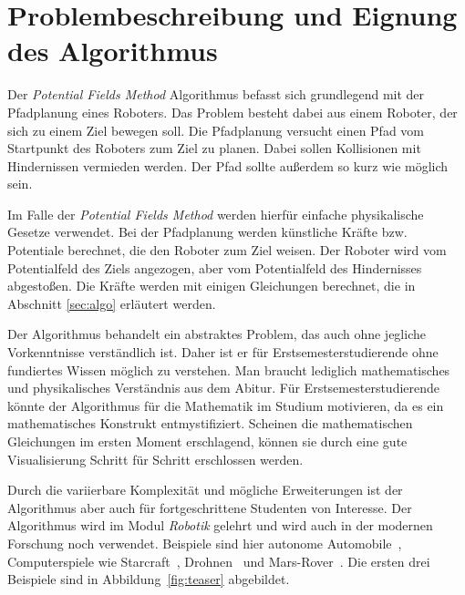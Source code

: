 
\section{Problembeschreibung und Eignung des Algorithmus}\label{sec:intro}

Der \textit{Potential Fields Method} Algorithmus befasst sich grundlegend mit der Pfadplanung eines Roboters. Das Problem besteht dabei aus einem Roboter, der sich zu einem Ziel bewegen soll. Die Pfadplanung versucht einen Pfad vom Startpunkt des Roboters zum Ziel zu planen. Dabei sollen Kollisionen mit Hindernissen vermieden werden. Der Pfad sollte außerdem so kurz wie möglich sein.

Im Falle der \textit{Potential Fields Method} werden hierfür einfache physikalische Gesetze verwendet. Bei der Pfadplanung werden künstliche Kräfte bzw. Potentiale berechnet, die den Roboter zum Ziel weisen. Der Roboter wird vom Potentialfeld des Ziels angezogen, aber vom Potentialfeld des Hindernisses abgestoßen. Die Kräfte werden mit einigen Gleichungen berechnet, die in Abschnitt \vref{sec:algo} erläutert werden.

Der Algorithmus behandelt ein abstraktes Problem, das auch ohne jegliche Vorkenntnisse verständlich ist. Daher ist er für Erstsemesterstudierende ohne fundiertes Wissen möglich zu verstehen. Man braucht lediglich mathematisches und physikalisches Verständnis aus dem Abitur. 
Für Erstsemesterstudierende könnte der Algorithmus für die Mathematik im Studium motivieren, da es ein mathematisches Konstrukt entmystifiziert. Scheinen die mathematischen Gleichungen im ersten Moment erschlagend, können sie durch eine gute Visualisierung Schritt für Schritt erschlossen werden. 

Durch die variierbare Komplexität und mögliche Erweiterungen ist der Algorithmus aber auch für fortgeschrittene Studenten von Interesse. 
Der Algorithmus wird im Modul \textit{Robotik} gelehrt und wird auch in der modernen Forschung noch verwendet. Beispiele sind hier autonome Automobile~\cite{dolgov2009path}, Computerspiele wie Starcraft~\cite{hagelback2012potential}, Drohnen~\cite{paul2008modelling} und Mars-Rover~\cite{massari2004autonomous}. Die ersten drei Beispiele sind in Abbildung~\vref{fig:teaser} abgebildet.


